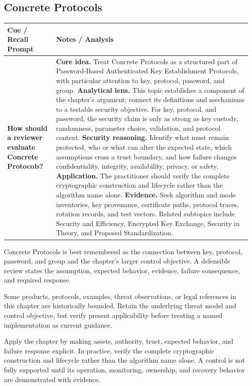 \documentclass[11pt]{article}
\newcommand{\CornellHeader}{%
\rowcolor{Navy}\color{white}\bfseries Cue / Recall Prompt & \color{white}\bfseries Notes / Analysis\\\hline}
\newcommand{\CornellRow}[2]{%
\cellcolor{CueGray}\RaggedRight\textbf{#1} & \RaggedRight #2\\\hline}
\begin{document}
\subsection*{Concrete Protocols}
\begin{longtable}{>{\RaggedRight\arraybackslash}p{}|>{\RaggedRight\arraybackslash}p{}}
\CornellHeader
\CornellRow{How should a reviewer evaluate Concrete Protocols?}{\textbf{Core idea.} Treat Concrete Protocols as a structured part of Password-Based Authenticated Key Establishment Protocols, with particular attention to key, protocol, password, and group. \textbf{Analytical lens.} This topic establishes a component of the chapter's argument; connect its definitions and mechanisms to a testable security objective. For key, protocol, and password, the security claim is only as strong as key custody, randomness, parameter choice, validation, and protocol context. \textbf{Security reasoning.} Identify what must remain protected, who or what can alter the expected state, which assumptions cross a trust boundary, and how failure changes confidentiality, integrity, availability, privacy, or safety. \textbf{Application.} The practitioner should verify the complete cryptographic construction and lifecycle rather than the algorithm name alone. \textbf{Evidence.} Seek algorithm and mode inventories, key provenance, certificate paths, protocol traces, rotation records, and test vectors. Related subtopics include Security and Efficiency, Encrypted Key Exchange, Security in Theory, and Proposed Standardization.}
\end{longtable}
\begin{topicsummary}
Concrete Protocols is best remembered as the connection between key, protocol, password, and group and the chapter's larger control objective. A defensible review states the assumption, expected behavior, evidence, failure consequence, and required response.
\end{topicsummary}
\begin{historybox}
Some products, protocols, examples, threat observations, or legal references in this chapter are historically bounded. Retain the underlying threat model and control objective, but verify present applicability before treating a named implementation as current guidance.
\end{historybox}
\begin{defensebox}
Apply the chapter by making assets, authority, trust, expected behavior, and failure response explicit. In practice, verify the complete cryptographic construction and lifecycle rather than the algorithm name alone. A control is not fully supported until its operation, monitoring, ownership, and recovery behavior are demonstrated with evidence.
\end{defensebox}
\end{document}
